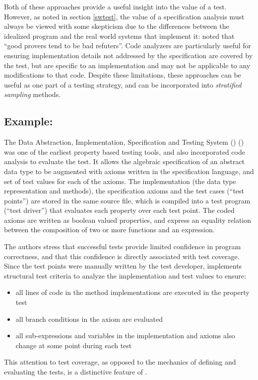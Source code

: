 Both of these approaches provide a useful insight into the value of a test.
However, as noted in section \ref{swtest}, 
the value of a specification analysis must 
always be viewed with some skepticism
due to the differences between the idealized program and
the real world systems that implement it:
\cite{JacksonDamon1996} noted that ``good provers tend to be bad refuters''.
Code analyzers are particularly useful for 
ensuring implementation details not addressed by the specification
are covered by the test,
but are specific to an implementation and may not be applicable
to any modifications to that code.
Despite these limitations,
these approaches can be useful as one part of a testing strategy,
and can be incorporated into \emph{stratified sampling} methods.

\subsection{Example: \DAISTS}\label{sub:DAISTS}

The Data Abstraction, Implementation, Specification and Testing System (\DAISTS) (\cite{GannonEtAl1981})
was one of the earliest property based testing tools,
and also incorporated code analysis to evaluate the test.
It allows the algebraic specification of an abstract data type
to be augmented with axioms written in the \DAISTS specification language,
and set of test values for each of the axioms.
The implementation (the data type representation and methods),
the specification axioms and the test cases (``test points'') are stored in the same source file,
which is compiled into a test program (``test driver'')
that evaluates each property over each test point.
The coded axioms are written as boolean valued properties,
and express an equality relation between 
the composition of two or more functions and an expression.

The authors stress that successful tests provide 
limited confidence in program correctness,
and that this confidence is directly associated with test coverage.
Since the test points were manually written by the test developer,
\DAISTS implements structural test criteria
to analyze the implementation and test values to ensure:
\begin{itemize}
\item all lines of code in the method implementations are executed in the property test
\item all branch conditions in the axiom are evaluated
\item all sub-expressions and variables in the implementation and axioms also change 
at some point during each test
\end{itemize}
\noindent This attention to test coverage,
as opposed to the mechanics of defining and evaluating the tests,
is a distinctive feature of \DAISTS.

